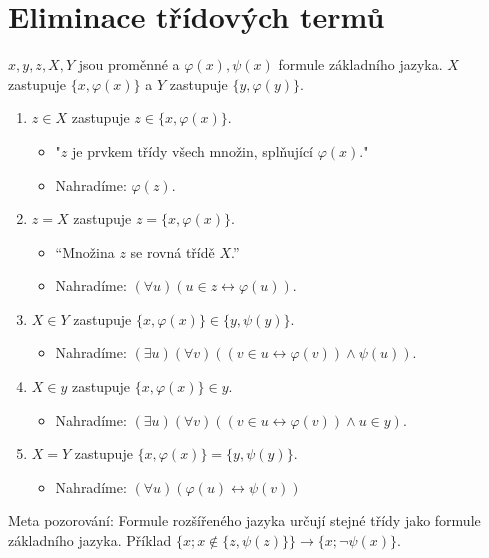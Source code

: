 \section{Eliminace třídových termů}

$x,y,z,X,Y$ jsou proměnné a $\varphi(x), \psi(x)$ formule základního jazyka. $X$ zastupuje $\{x, \varphi(x)\}$ a $Y$ zastupuje $\{y, \varphi(y)\}$.

\begin{enumerate}
	\item $z \in X$ zastupuje $z \in \{x, \varphi(x)\}$.
	\begin{itemize}
		\item "$z$ je prvkem třídy všech množin, splňující $\varphi(x)$."
		\item Nahradíme: $\varphi (z)$.
	\end{itemize}
	\item $z = X$ zastupuje $z = \{x, \varphi(x)\}$.
	\begin{itemize}
		\item “Množina $z$ se rovná třídě $X$.”
		\item Nahradíme: $(\forall u)( u \in z \leftrightarrow \varphi(u))$.
	\end{itemize}
	\item $X \in Y$ zastupuje $\{x, \varphi(x)\} \in \{y, \psi(y)\}$.
	\begin{itemize}
		\item Nahradíme: $(\exists u)(\forall v)((v \in u \leftrightarrow \varphi (v)) \land \psi(u))$.
	\end{itemize}
	\item $X \in y$ zastupuje $\{x, \varphi(x)\} \in y$.
	\begin{itemize}
		\item Nahradíme: $(\exists u)(\forall v)((v \in u \leftrightarrow \varphi (v)) \land u \in y)$.
	\end{itemize}
	\item $X = Y$ zastupuje $\{x, \varphi(x)\} = \{y, \psi(y)\}$.
	\begin{itemize}
		\item Nahradíme: $(\forall u)(\varphi(u) \leftrightarrow \psi(v))$
	\end{itemize}
\end{enumerate}

Meta pozorování: Formule rozšířeného jazyka určují stejné třídy jako formule základního jazyka. Příklad $\{x; x \notin \{z, \psi(z)\}\} \rightarrow \{x; \neg \psi(x)\}$.


